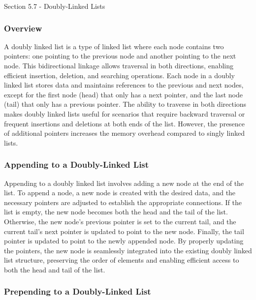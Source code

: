 \begin{notes}{Section 5.7 - Doubly-Linked Lists}
    \subsubsection*{Overview}

    A doubly linked list is a type of linked list where each node contains two pointers: one pointing to the previous node and another pointing to the next node. This bidirectional linkage allows traversal in both directions, enabling efficient insertion, deletion, and searching operations. Each node 
    in a doubly linked list stores data and maintains references to the previous and next nodes, except for the first node (head) that only has a next pointer, and the last node (tail) that only has a previous pointer. The ability to traverse in both directions makes doubly linked lists useful for 
    scenarios that require backward traversal or frequent insertions and deletions at both ends of the list. However, the presence of additional pointers increases the memory overhead compared to singly linked lists.
    
    \subsubsection*{Appending to a Doubly-Linked List}
    
    Appending to a doubly linked list involves adding a new node at the end of the list. To append a node, a new node is created with the desired data, and the necessary pointers are adjusted to establish the appropriate connections. If the list is empty, the new node becomes both the head and the tail 
    of the list. Otherwise, the new node's previous pointer is set to the current tail, and the current tail's next pointer is updated to point to the new node. Finally, the tail pointer is updated to point to the newly appended node. By properly updating the pointers, the new node is seamlessly integrated 
    into the existing doubly linked list structure, preserving the order of elements and enabling efficient access to both the head and tail of the list.
    
    \subsubsection*{Prepending to a Doubly-Linked List}
    

\end{notes}
